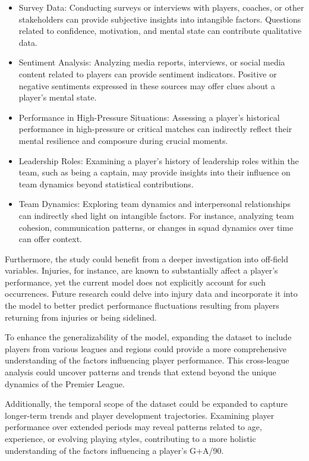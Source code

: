 \documentclass[12pt]{article}
\begin{document}
\begin{itemize}
  \item Survey Data: Conducting surveys or interviews with players, coaches, or
  other stakeholders can provide subjective insights into intangible factors.
  Questions related to confidence, motivation, and mental state can contribute
  qualitative data.
  \item Sentiment Analysis: Analyzing media reports, interviews, or social media
  content related to players can provide sentiment indicators. Positive or
  negative sentiments expressed in these sources may offer clues about a player's
  mental state.
  \item Performance in High-Pressure Situations: Assessing a player's historical
  performance in high-pressure or critical matches can indirectly reflect their
  mental resilience and composure during crucial moments.
  \item Leadership Roles: Examining a player's history of leadership roles within
   the team, such as being a captain, may provide insights into their influence
   on team dynamics beyond statistical contributions.
   \item Team Dynamics: Exploring team dynamics and interpersonal relationships
   can indirectly shed light on intangible factors. For instance, analyzing team
   cohesion, communication patterns, or changes in squad dynamics over time can
   offer context.
\end{itemize}

Furthermore, the study could benefit from a deeper investigation into off-field
variables. Injuries, for instance, are known to substantially affect a player's
performance, yet the current model does not explicitly account for such occurrences.
Future research could delve into injury data and incorporate it into the model
to better predict performance fluctuations resulting from players returning from
injuries or being sidelined.

To enhance the generalizability of the model, expanding the dataset to include
players from various leagues and regions could provide a more comprehensive
understanding of the factors influencing player performance. This cross-league
analysis could uncover patterns and trends that extend beyond the unique dynamics
of the Premier League.

Additionally, the temporal scope of the dataset could be expanded to capture
longer-term trends and player development trajectories. Examining player
performance over extended periods may reveal patterns related to age, experience,
or evolving playing styles, contributing to a more holistic understanding of the
factors influencing a player's G+A/90.
\end{document}
